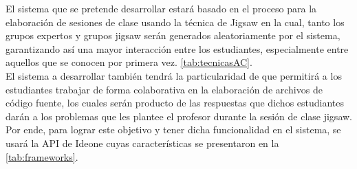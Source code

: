 El sistema que se pretende desarrollar estará basado en el proceso para la elaboración de sesiones de clase usando la técnica de Jigsaw en la cual, tanto los grupos expertos y grupos jigsaw serán generados aleatoriamente por el sistema, garantizando así una mayor interacción entre los estudiantes, especialmente entre aquellos que se conocen por primera vez. \autoref{tab:tecnicasAC}.\\

El sistema a desarrollar también tendrá la particularidad de que permitirá a los estudiantes trabajar de forma colaborativa en la elaboración de archivos de código fuente, los cuales serán producto de las respuestas que dichos estudiantes darán a los problemas que les plantee el profesor durante la sesión de clase jigsaw. Por ende, para lograr este objetivo y tener dicha funcionalidad en el sistema, se usará la API de Ideone cuyas características se presentaron en la \autoref{tab:frameworks}.\\

